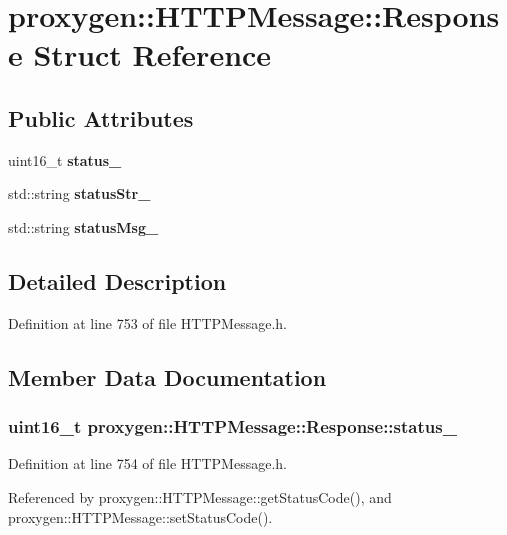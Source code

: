 \section{proxygen\+:\+:H\+T\+T\+P\+Message\+:\+:Response Struct Reference}
\label{structproxygen_1_1HTTPMessage_1_1Response}
\subsection*{Public Attributes}
\begin{DoxyCompactItemize}
\item 
uint16\+\_\+t {\bf status\+\_\+}
\item 
std\+::string {\bf status\+Str\+\_\+}
\item 
std\+::string {\bf status\+Msg\+\_\+}
\end{DoxyCompactItemize}


\subsection{Detailed Description}


Definition at line 753 of file H\+T\+T\+P\+Message.\+h.



\subsection{Member Data Documentation}
\subsubsection[{status\+\_\+}]{\setlength{\rightskip}{0pt plus 5cm}uint16\+\_\+t proxygen\+::\+H\+T\+T\+P\+Message\+::\+Response\+::status\+\_\+}\label{structproxygen_1_1HTTPMessage_1_1Response_ae7b1e3c75c40815f337eedf2eb5e7005}


Definition at line 754 of file H\+T\+T\+P\+Message.\+h.



Referenced by proxygen\+::\+H\+T\+T\+P\+Message\+::get\+Status\+Code(), and proxygen\+::\+H\+T\+T\+P\+Message\+::set\+Status\+Code().

